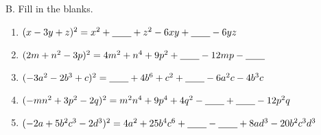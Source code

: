 B. Fill in the blanks. 
\begin{enumerate}[label = \arabic*. ]
\item \hspce $(x - 3y + z)^{2} = x^{2} + \underline{\hspace{2em}} + z^{2}- 6 x y + \underline{\hspace{2em}}   - 6 y z $
\item \hspce $(2m + n^{2} - 3p)^{2} = 4 m^{2} + n^{4} + 9 p^{2} + \underline{\hspace{2em}}  - 12 mp  - \underline{\hspace{2em}}  $
\item \hspce $(-3a^{2} - 2b^{3} + c)^{2} = \underline{\hspace{2em}}  + 4 b^{6} + c^{2} + \underline{\hspace{2em}}  - 6 a^{2} c  - 4 b^{3} c  $
\item \hspce $(-mn^{2} + 3p^{2} - 2q)^{2} = m^{2} n^{4} + 9 p^{4} + 4 q^{2} - \underline{\hspace{2em}}  + \underline{\hspace{2em}}  - 12 p^{2} q  $
\item \hspce $(-2a + 5b^{2}c^{3} - 2d^{3})^{2} =  4 a^{2} + 25 b^{4} c^{6} + \underline{\hspace{2em}}  - \underline{\hspace{2em}}  + 8 ad^{3}  - 20 b^{2} c^{3} d^{3} $

\end{enumerate}  